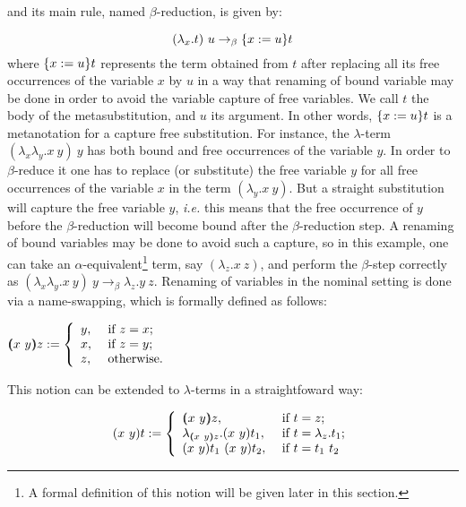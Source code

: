 \noindent and its main rule, named $\beta$-reduction, is given by:


\begin{equation}\label{lambda:beta}
 (\lambda_x.t)\ u \to_{\beta} \metasub{t}{x}{u}
\end{equation}
\noindent where $\metasub{t}{x}{u}$ represents the term obtained from $t$ after replacing all its free occurrences of the variable $x$ by $u$ in a way that renaming of bound variable may be done in order to avoid the variable capture of free variables. We call $t$ the body of the metasubstitution, and $u$ its argument. In other words, $\metasub{t}{x}{u}$ is a metanotation for a capture free substitution. For instance, the $\lambda$-term $(\lambda_x\lambda_y.x\ y)\ y$ has both bound and free occurrences of the variable $y$. In order to $\beta$-reduce it one has to replace (or substitute) the free variable $y$ for all free occurrences of the variable $x$ in the term $(\lambda_y.x\ y)$. But a straight substitution will capture the free variable $y$, {\it i.e.} this means that the free occurrence of $y$ before the $\beta$-reduction will become bound after the $\beta$-reduction step. A renaming of bound variables may be done to avoid such a capture, so in this example, one can take an $\alpha$-equivalent\footnote{A formal definition of this notion will be given later in this section.} term, say $(\lambda_z.x\ z)$, and perform the $\beta$-step correctly as $(\lambda_x\lambda_y.x\ y)\ y \to_{\beta} \lambda_z.y\ z$. Renaming of variables in the nominal setting is done via a name-swapping, which is formally defined as follows:


$\vswap{x}{y}{z} := \left\{ \begin{array}{ll}
y, & \mbox{ if } z = x; \\
x, & \mbox{ if } z = y; \\
z, & \mbox{ otherwise. } \\
\end{array}\right.$


This notion can be extended to $\lambda$-terms in a straightfoward way:


\begin{equation}\label{def:swap}
\swap{x}{y}{t} := \left\{ \begin{array}{ll}
\vswap{x}{y}{z}, & \mbox{ if } t = z; \\
\lambda_{\vswap{x}{y}{z}}.\swap{x}{y}{t_1}, & \mbox{ if } t = \lambda_z.t_1; \\
\swap{x}{y}{t_1}\ \swap{x}{y}{t_2}, & \mbox{ if } t = t_1\ t_2\\
\end{array}\right.
\end{equation}


